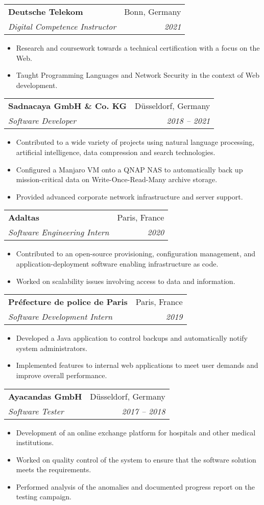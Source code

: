 \documentclass[a4paper,11pt]{article}
\makeatletter
\newcommand{\resumeItem}[2]{
  \item\small{
    \textbf{#1}{ #2 \vspace{-2pt}}
  }
}
\newcommand{\resumeSubheading}[4]{
  \vspace{-1pt}\item
    \begin{tabular*}{0.97\textwidth}{l@{\extracolsep{\fill}}r}
      \textbf{#1} & #2 \\
      \textit{\small#3} & \textit{\small #4} \\
    \end{tabular*}\vspace{-5pt}
}
\newcommand{\resumeItemListStart}{\begin{itemize}}
\newcommand{\resumeItemListEnd}{\end{itemize}\vspace{-5pt}}
\makeatother
\begin{document}
      \resumeSubheading
      {Deutsche Telekom}{Bonn, Germany}
      {Digital Competence Instructor}{2021}
      \resumeItemListStart
        \resumeItem{}
          {Research and coursework towards a technical certification with a focus on the Web.}
        \resumeItem{}
          {Taught Programming Languages and Network Security in the context of Web development.}
    \resumeItemListEnd
      
    \resumeSubheading
      {Sadnacaya GmbH \& Co. KG}{Düsseldorf, Germany}
      {Software Developer}{2018 -- 2021}
      \resumeItemListStart
        \resumeItem{}
          {Contributed to a wide variety of projects using natural language processing, artificial intelligence, data compression and search technologies.}
        \resumeItem{}
          {Configured a Manjaro VM onto a QNAP NAS to automatically back up mission-critical data on Write-Once-Read-Many archive storage.}
        \resumeItem{}
          {Provided advanced corporate network infrastructure and server support.}
      \resumeItemListEnd

    \resumeSubheading
      {Adaltas}{Paris, France}
      {Software Engineering Intern}{2020}
      \resumeItemListStart
        \resumeItem{}
          {Contributed to an open-source provisioning, configuration management, and application-deployment software enabling infrastructure as code.}
        \resumeItem{}
          {Worked on scalability issues involving access to data and information.}
      \resumeItemListEnd
  
    \resumeSubheading
      {Préfecture de police de Paris}{Paris, France}
      {Software Development Intern}{2019}
      \resumeItemListStart
        \resumeItem{}
          {Developed a Java application to control backups and automatically notify system administrators.}
        \resumeItem{}
          {Implemented features to internal web applications to meet user demands and improve overall performance.}
      \resumeItemListEnd
      
    \resumeSubheading
      {Ayacandas GmbH}{Düsseldorf, Germany}
      {Software Tester}{2017 -- 2018}
      \resumeItemListStart
        \resumeItem{}
          {Development of an online exchange platform for hospitals and other medical institutions.}
        \resumeItem{}
          {Worked on quality control of the system to ensure that the software solution meets the requirements.}
        \resumeItem{}
          {Performed analysis of the anomalies and documented progress report on the testing campaign.}
      \resumeItemListEnd
\end{document}

